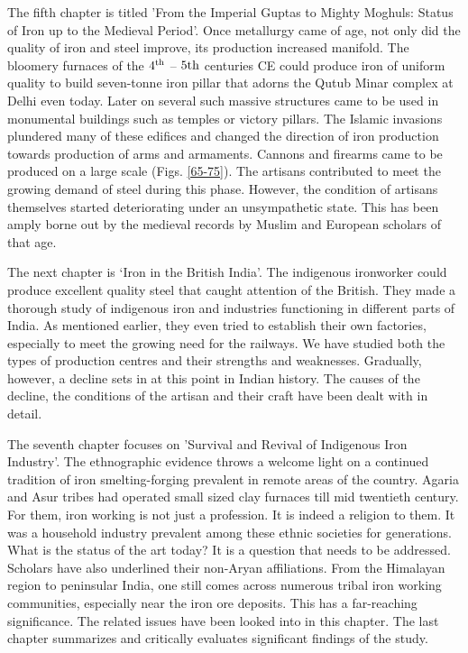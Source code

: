 The fifth chapter is titled 'From the Imperial Guptas to Mighty Moghuls: Status of Iron up to the Medieval Period'. Once metallurgy came of age, not only did the quality of iron and steel improve, its production increased manifold. The bloomery furnaces of the $4^{\rm th}$ – $5{\rm th}$ centuries CE could produce iron of uniform quality to build seven-tonne iron pillar that adorns the Qutub Minar complex at Delhi even today. Later on several such massive structures came to be used in monumental buildings such as temples or victory pillars. The Islamic invasions plundered many of these edifices and changed the direction of iron production towards production of arms and armaments. Cannons and firearms came to be produced on a large scale (Figs. \ref{65-75}). The artisans contributed to meet the growing demand of steel during this phase. However, the condition of artisans themselves started deteriorating under an unsympathetic state. This has been amply borne out by the medieval records by Muslim and European scholars of that age.

The next chapter is `Iron in the British India'. The indigenous ironworker could produce excellent quality steel that caught attention of the British. They made a thorough study of indigenous iron and industries functioning in different parts of India. As mentioned earlier, they even tried to establish their own factories, especially to meet the growing need for the railways. We have studied both the types of production centres and their strengths and weaknesses. Gradually, however, a decline sets in at this point in Indian history. The causes of the decline, the conditions of the artisan and their craft have been dealt with in detail.

The seventh chapter focuses on 'Survival and Revival of Indigenous Iron Industry'. The ethnographic evidence throws a welcome light on a continued tradition of iron smelting-forging prevalent in remote areas of the country. Agaria and Asur tribes had operated small sized clay furnaces till mid twentieth century. For them, iron working is not just a profession. It is indeed a religion to them. It was a household industry prevalent among these ethnic societies for generations. What is the status of the art today? It is a question that needs to be addressed. Scholars have also underlined their non-Aryan affiliations. From the Himalayan region to peninsular India, one still comes across numerous tribal iron working communities, especially near the iron ore deposits. This has a far-reaching significance. The related issues have been looked into in this chapter. The last chapter summarizes and critically evaluates significant findings of the study.











